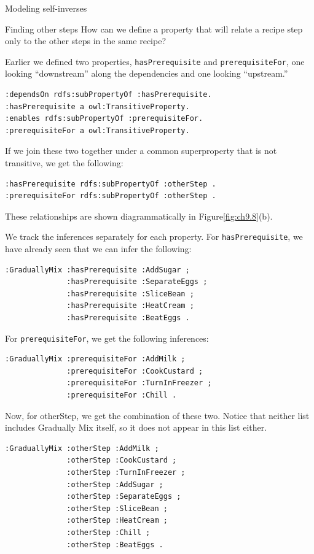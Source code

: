 \begin{challenge}{Modeling self-inverses}
\begin{challenge}{Finding other steps}
How can we define a property that will relate a recipe step only to the
other steps in the same recipe?

\solution

Earlier we defined two properties, \texttt{hasPrerequisite} and \texttt{prerequisiteFor},
one looking ``downstream'' along the dependencies and one looking
``upstream.''

\begin{lstlisting}
:dependsOn rdfs:subPropertyOf :hasPrerequisite.
:hasPrerequisite a owl:TransitiveProperty.
:enables rdfs:subPropertyOf :prerequisiteFor.
:prerequisiteFor a owl:TransitiveProperty.
\end{lstlisting}

If we join these two together under a common superproperty that is not
transitive, we get the following:

\begin{lstlisting}
:hasPrerequisite rdfs:subPropertyOf :otherStep .
:prerequisiteFor rdfs:subPropertyOf :otherStep .
\end{lstlisting}

These relationships are shown diagrammatically in Figure\ref{fig:ch9.8}(b).

We track the inferences separately for each property. For
\texttt{hasPrerequisite}, we have already seen that we can infer the following:

\begin{lstlisting}
:GraduallyMix :hasPrerequisite :AddSugar ;
              :hasPrerequisite :SeparateEggs ;
              :hasPrerequisite :SliceBean ;
              :hasPrerequisite :HeatCream ;
              :hasPrerequisite :BeatEggs .
\end{lstlisting}

For \texttt{prerequisiteFor}, we get the following inferences:

\begin{lstlisting}
:GraduallyMix :prerequisiteFor :AddMilk ;
              :prerequisiteFor :CookCustard ;
              :prerequisiteFor :TurnInFreezer ;
              :prerequisiteFor :Chill .
\end{lstlisting}

Now, for otherStep, we get the combination of these two. Notice that
neither list includes Gradually
Mix itself, so it does not appear in this list either.

\begin{lstlisting}
:GraduallyMix :otherStep :AddMilk ;
              :otherStep :CookCustard ;
              :otherStep :TurnInFreezer ;
              :otherStep :AddSugar ;
              :otherStep :SeparateEggs ;
              :otherStep :SliceBean ;
              :otherStep :HeatCream ;
              :otherStep :Chill ;
              :otherStep :BeatEggs .
\end{lstlisting}


\end{challenge}
\end{challenge}
